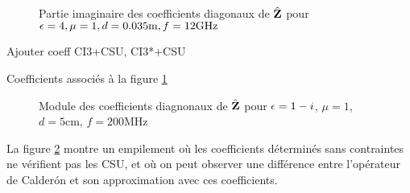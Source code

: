       \begin{figure}[!hbt]
          \centering
          
          \caption[Partie imaginaire de l'opérateur de Calderón, comparé avec les approximations CI0, CI3 pour une couche plane de matériau sans pertes de P.~Soudais]{Partie imaginaire des coefficients diagonaux de \(\hat{\mathbf{Z}}\) pour \(\epsilon = 4, \mu = 1, d=0.035\text{m}, f=12\text{GHz}\)}
          \label{fig:imp_fourier:plan:soudais:hoibc}
      \end{figure}
      \begin{table}[!hbt]
        \centering
        \begin{TODO}
          Ajouter coeff CI3+CSU, CI3*+CSU
        \end{TODO}
        \caption{Coefficients associés à la figure \ref{fig:imp_fourier:plan:soudais:hoibc}}
        \label{tab:imp_fourier:plan:soudais:hoibc}
      \end{table}


      \begin{figure}[!hbt]
        \centering
        
        \caption[Module de la matrice d'impédance pour le matériau M1, perte de précision à cause de la CSU]{ Module des coefficients diagnonaux de \(\hat{\mathbf{Z}}\) pour \(\epsilon = 1-i\), \(\mu = 1\), \(d=5\)cm, \(f=200\)MHz}
        \label{fig:imp_fourier:plan:stupfel:hoibc_vs_csu}
      \end{figure}

      La figure \ref{fig:imp_fourier:plan:stupfel:hoibc_vs_csu} montre un empilement où les coefficients déterminés sans contraintes ne vérifient pas les CSU, et où on peut observer une différence entre l'opérateur de Calderón et son approximation avec ces coefficients.

